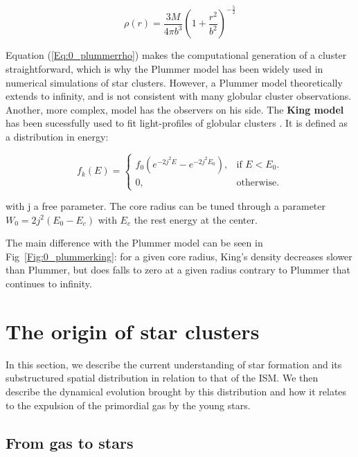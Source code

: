 \begin{equation}
\label{Eq:0_plummerrho}
\rho(r) = \frac{3 M}{4 \pi b^3} \left( 1 + \frac{r^2}{b^2} \right) ^{- \frac{5}{2}}
\end{equation}

Equation (\ref{Eq:0_plummerrho}) makes the computational generation of a cluster straightforward, which is why the Plummer model has been widely used in numerical simulations of star clusters.
However, a Plummer model theoretically extends to infinity, and is not consistent with many globular cluster observations. Another, more complex, model has the observers on his side. The \textbf{King model} has been sucessfully used to fit light-profiles of globular clusters \citep{King1981}. It is defined as a distribution in energy:

\begin{equation}
  f_k(E)=\begin{cases}
    f_0 \left(e^{-2j^2E} - e^{-2j^2E_0}\right)  , & \text{if $E<E_0$}.\\
    0, & \text{otherwise}.
  \end{cases}
\end{equation}

with j a free parameter. The core radius can be tuned through a parameter $W_0 =2j^2(E_0 - E_c)$ with $E_c$ the rest energy at the center. 

The main difference with the Plummer model can be seen in Fig~\ref{Fig:0_plummerking}: for a given core radius, King's density decreases slower than Plummer, but does falls to zero at a given radius contrary to Plummer that continues to infinity.






\section{The origin of star clusters}

In this section, we describe the current understanding of star formation and its substructured spatial distribution in relation to that of the ISM. We then describe the dynamical evolution brought by this distribution and how it relates to the expulsion of the primordial gas by the young stars.


\subsection{From gas to stars}

